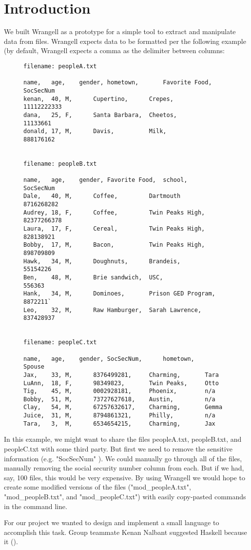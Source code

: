 \documentclass[preprint,nocopyrightspace]{sig-alternate}
\begin{document}
\section{Introduction}
We built Wrangell as a prototype for a simple tool to extract and manipulate data from files. Wrangell expects data to be formatted per the following example (by default, Wrangell expects a comma as the delimiter between columns: 
\begin{figure}
\begin{verbatim}
filename: peopleA.txt

name,	age,	gender,	hometown,		Favorite Food,	SocSecNum
kenan,	40,	M,		Cupertino,		Crepes,			11112222333
dana,	25,	F,		Santa Barbara,	Cheetos,		11133661
donald,	17,	M,		Davis,			Milk,			888176162


filename: peopleB.txt

name,	age,	gender,	Favorite Food,	school,				SocSecNum
Dale,	40,	M,		Coffee,			Dartmouth			8716268282
Audrey,	18,	F,		Coffee,			Twin Peaks High,	82377266378
Laura,	17,	F,		Cereal,			Twin Peaks High,	828138921
Bobby,	17,	M,		Bacon,			Twin Peaks High,	898709809
Hawk,	34,	M,		Doughnuts,		Brandeis,			55154226
Ben,	48,	M,		Brie sandwich,	USC,				556363
Hank,	34,	M,		Dominoes,		Prison GED Program,	8872211`
Leo,	32,	M,		Raw Hamburger,	Sarah Lawrence,		837428937


filename: peopleC.txt

name,	age,	gender,	SocSecNum,		hometown,		Spouse
Jax,	33,	M,		8376499281,		Charming,		Tara
LuAnn,	18,	F,		98349823,		Twin Peaks,		Otto
Tig,	45,	M,		0002928181,		Phoenix,		n/a
Bobby,	51,	M,		73727627618,	Austin,			n/a
Clay,	54,	M,		67257632617,	Charming,		Gemma
Juice,	31,	M,		8794861321,		Philly,			n/a
Tara,	3,	M,		6534654215,		Charming,		Jax

\end{verbatim}
\end{figure}

In this example, we might want to share the files peopleA.txt, peopleB.txt, and peopleC.txt with some third party. But first we need to remove the sensitive information (e.g. "SocSecNum" ). We could manually go through all of the files, manually removing the social security number column from each. But if we had, say, 100 files, this would be very expensive. By using Wrangell we would hope to create some modified versions of the files ("mod\_peopleA.txt", "mod\_peopleB.txt", and "mod\_peopleC.txt") with easily copy-pasted commands in the command line.

For our project we wanted to design and implement a small language to accomplish this task. Group teammate Kenan Nalbant suggested Haskell because it (). 
\end{document}
